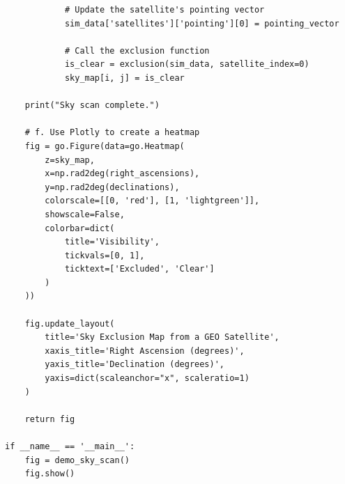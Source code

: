 \documentclass[11pt]{article}
\begin{document}
\begin{Verbatim}
            # Update the satellite's pointing vector
            sim_data['satellites']['pointing'][0] = pointing_vector

            # Call the exclusion function
            is_clear = exclusion(sim_data, satellite_index=0)
            sky_map[i, j] = is_clear

    print("Sky scan complete.")

    # f. Use Plotly to create a heatmap
    fig = go.Figure(data=go.Heatmap(
        z=sky_map,
        x=np.rad2deg(right_ascensions),
        y=np.rad2deg(declinations),
        colorscale=[[0, 'red'], [1, 'lightgreen']],
        showscale=False,
        colorbar=dict(
            title='Visibility',
            tickvals=[0, 1],
            ticktext=['Excluded', 'Clear']
        )
    ))

    fig.update_layout(
        title='Sky Exclusion Map from a GEO Satellite',
        xaxis_title='Right Ascension (degrees)',
        yaxis_title='Declination (degrees)',
        yaxis=dict(scaleanchor="x", scaleratio=1)
    )

    return fig

if __name__ == '__main__':
    fig = demo_sky_scan()
    fig.show()
\end{Verbatim}
\end{document}
